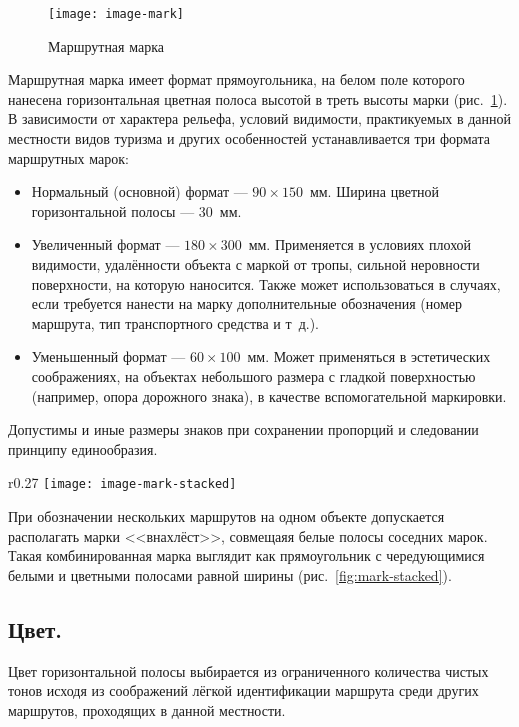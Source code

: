 \documentclass[a4paper,12pt,titlepage]{extarticle}
\begin{document}
\begin{figure}
	\centering
	\texttt{[image: image-mark]}
	\caption{Маршрутная марка}\label{fig:mark}
\end{figure}

Маршрутная марка имеет формат прямоугольника, на белом поле которого нанесена горизонтальная цветная полоса высотой в
треть высоты марки (рис.~\ref{fig:mark}). В зависимости от характера рельефа, условий видимости, практикуемых в данной
местности видов туризма и других особенностей устанавливается три формата маршрутных марок:
\begin{itemize}
	\item Нормальный (основной) формат --- $90\times150$~мм. Ширина цветной горизонтальной полосы --- 30~мм.
	\item Увеличенный формат --- $180\times300$~мм. Применяется в условиях плохой видимости, удалённости объекта с маркой от
тропы, сильной неровности поверхности, на которую наносится. Также может использоваться в случаях, если требуется
нанести на марку дополнительные обозначения (номер маршрута, тип транспортного средства и т~д.).
\item Уменьшенный формат --- $60\times100$~мм. Может применяться в эстетических соображениях, на объектах небольшого размера с
гладкой поверхностью (например, опора дорожного знака), в качестве вспомогательной маркировки.
\end{itemize}

Допустимы и иные размеры знаков при сохранении пропорций и следовании принципу единообразия.

\begin{wrapfigure}{r}{0.27\textwidth}
	\centering
	\texttt{[image: image-mark-stacked]}
	\caption{Комбинированная маршрутная марка}\label{fig:mark-stacked}
\end{wrapfigure}

При обозначении нескольких маршрутов на одном объекте допускается располагать марки <<внахлёст>>, совмещаяя белые полосы
соседних марок. Такая комбинированная марка выглядит как прямоугольник с чередующимися белыми и цветными полосами равной
ширины (рис.~\ref{fig:mark-stacked}).

\subsection{Цвет.}
Цвет горизонтальной полосы выбирается из ограниченного количества чистых тонов исходя из соображений лёгкой
идентификации маршрута среди других маршрутов, проходящих в данной местности.
\end{document}
